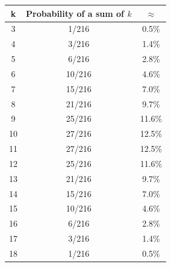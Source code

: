 \documentclass[9pt]{beamer}
\begin{document}
\begin{frame}[fragile,t] %

  \begin{center}
  \renewcommand{\arraystretch}{1.2}
  \begin{tabular}{|c|c|c|} \hline
    k  & Probability of a sum of $k$ & $\approx$ \\ \hline
    3  & 1/216                       & 0.5\%     \\
    4  & 3/216                       & 1.4\%     \\
    5  & 6/216                       & 2.8\%     \\
    6  & 10/216                      & 4.6\%     \\
    7  & 15/216                      & 7.0\%     \\
    8  & 21/216                      & 9.7\%     \\
    9  & 25/216                      & 11.6\%    \\
    10 & 27/216                      & 12.5\%    \\
    11 & 27/216                      & 12.5\%    \\
    12 & 25/216                      & 11.6\%    \\
    13 & 21/216                      & 9.7\%     \\
    14 & 15/216                      & 7.0\%     \\
    15 & 10/216                      & 4.6\%     \\
    16 & 6/216                       & 2.8\%     \\
    17 & 3/216                       & 1.4\%     \\
    18 & 1/216                       & 0.5\%     \\ \hline
  \end{tabular}

  \end{center}
\end{frame}
\end{document}
